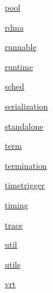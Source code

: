 \begin{DoxyCompactItemize}
 \hyperlink{namespacevt_1_1pool}{pool}
\item 
 \hyperlink{namespacevt_1_1rdma}{rdma}
\item 
 \hyperlink{namespacevt_1_1runnable}{runnable}
\item 
 \hyperlink{namespacevt_1_1runtime}{runtime}
\item 
 \hyperlink{namespacevt_1_1sched}{sched}
\item 
 \hyperlink{namespacevt_1_1serialization}{serialization}
\item 
 \hyperlink{namespacevt_1_1standalone}{standalone}
\item 
 \hyperlink{namespacevt_1_1term}{term}
\item 
 \hyperlink{namespacevt_1_1termination}{termination}
\item 
 \hyperlink{namespacevt_1_1timetrigger}{timetrigger}
\item 
 \hyperlink{namespacevt_1_1timing}{timing}
\item 
 \hyperlink{namespacevt_1_1trace}{trace}
\item 
 \hyperlink{namespacevt_1_1util}{util}
\item 
 \hyperlink{namespacevt_1_1utils}{utils}
\item 
 \hyperlink{namespacevt_1_1vrt}{vrt}
\end{DoxyCompactItemize}
